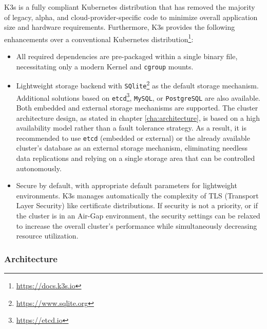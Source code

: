 K3s is a fully compliant Kubernetes distribution that has removed the majority of
legacy, alpha, and cloud-provider-specific code to minimize overall application size
and hardware requirements. Furthermore, K3s provides the following enhancements over
a conventional Kubernetes distribution\footnote{\url{https://docs.k3s.io}}:
\begin{itemize}
  \item All required dependencies are pre-packaged within a single binary file,
    necessitating only a modern Kernel and \texttt{cgroup} mounts.

  \item Lightweight storage backend with \texttt{SQlite}\footnote{\url{https://www.sqlite.org}}
    as the default storage mechanism. Additional solutions based on \texttt{etcd}\footnote{\url{https://etcd.io}},
    \texttt{MySQL}, or \texttt{PostgreSQL} are also available. Both embedded and
    external storage mechanisms are supported.
    \newline
    The cluster architecture design, as stated in chapter \ref{cha:architecture},
    is based on a high availability model rather than a fault tolerance strategy.
    As a result, it is recommended to use \texttt{etcd} (embedded or external) or
    the already available cluster's database as an external storage mechanism,
    eliminating needless data replications and relying on a single storage area
    that can be controlled autonomously.

  \item Secure by default, with appropriate default parameters for lightweight
    environments. K3s manages automatically the complexity of TLS (Transport
    Layer Security) like certificate distributions.
    \newline
    If security is not a priority, or if the cluster is in an Air-Gap environment,
    the security settings can be relaxed to increase the overall cluster's
    performance while simultaneously decreasing resource utilization.
\end{itemize}

\subsubsection{Architecture}
\label{subsubsec:implementation_dependencies_k3s_architecture}

